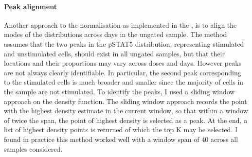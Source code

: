 \paragraph{Peak alignment}
Another approach to the normalisation as implemented in the , is to align the modes
of the distributions across days in the ungated sample.
The method assumes that the two peaks in the pSTAT5 distribution,
representing stimulated and unstimulated cells,
should exist in all ungated samples, but that their locations and their proportions may vary across doses and days.
However peaks are not always clearly identifiable.
In particular, the second peak corresponding to the stimulated cells is much broader and smaller since the majority of cells in the sample are not stimulated.
To identify the peaks, I used a sliding window approach on the density function.
The sliding window approach records the point with the highest density estimate in the current window,
so that within a window of twice the span, the point of highest density is selected as a peak.
At the end, a list of highest density points is returned of which the top K may be selected.
I found in practice this method worked well with a window span of $40$ across all samples considered.
